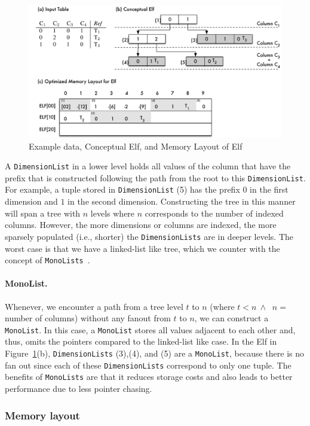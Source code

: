 \documentclass[runningheads,a4paper]{llncs}
\begin{document}
\begin{figure}[htb]
	\centering
		\includegraphics[width=.8\textwidth]{Elf.pdf}
	\caption{Example data, Conceptual Elf, and Memory Layout of Elf}
	\label{fig:Elf}
\end{figure}

A \verb.DimensionList. in a lower level holds all values of the column that have the prefix that is constructed following the path from the root to this \verb.DimensionList.. For example, a tuple stored in  \verb.DimensionList. (5) has the prefix $0$ in the first dimension and $1$ in the second dimension. Constructing the tree in this manner will span a tree with $n$ levels where $n$ corresponds to the number of indexed columns. However, the more dimensions or columns are indexed, the more sparsely populated (i.e., shorter) the  \verb.DimensionLists. are in deeper levels. The worst case is that we have a linked-list like tree, which we counter with the concept of  \verb.MonoLists.~\cite{BKS+17}.



\paragraph{MonoList.} Whenever, we encounter a path from a tree level $t$ to $n$ (where $t < n~\land~$ $n=$ number of columns) without any fanout from $t$ to $n$, we can construct a \verb.MonoList.. In this case, a \verb.MonoList. stores all values adjacent to each other and, thus, omits the pointers compared to the linked-list like case. In the Elf in Figure~\ref{fig:Elf}(b), \verb.DimensionLists. (3),(4), and (5) are a \verb.MonoList., because there is no fan out since each of these \verb.DimensionLists. correspond to only one tuple. The benefits of \verb.MonoLists. are that it reduces storage costs and also leads to better performance due to less pointer chasing. 


\subsubsection{Memory layout}
\end{document}
